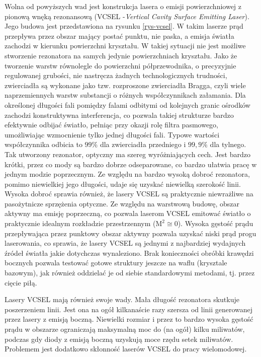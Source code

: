 \documentclass[a4paper,10pt]{article}
\begin{document}
Wolna od powyższych wad jest konstrukcja lasera o emisji powierzchniowej z pionową wnęką rezonansową (VCSEL -\textit{Vertical Cavity Surface Emitting Laser}). Jego budowa jest przedstawiona na rysunku \ref{rys-vcsel}. W takim laserze prąd przepływa przez obszar mający postać punktu, nie paska, a emisja światła zachodzi w kierunku powierzchni kryształu. W takiej sytuacji nie jest możliwe stworzenie rezonatora na samych jedynie powierzchniach kryształu. Jako że tworzenie warstw równolegle do powierzchni półprzewodnika, o precyzyjnie regulowanej grubości, nie nastręcza żadnych technologicznych trudności, zwierciadła są wykonane jako tzw. rozproszone zwierciadła Bragga, czyli wiele naprzemiennych warstw substancji o różnych współczynnikach załamania. Dla określonej długości fali pomiędzy falami odbitymi od kolejnych granic ośrodków zachodzi konstruktywna interferencja, co pozwala takiej strukturze bardzo efektywnie odbijać światło, pełniąc przy okazji rolę filtra pasmowego, umożliwiając wzmocnienie tylko jednej długości fali. Typowe wartości współczynnika odbicia to $99\%$ dla zwierciadła przedniego i $99{,}9\%$ dla tylnego. Tak utworzony rezonator, optyczny ma szereg wyróżniających cech. Jest bardzo krótki, przez co mody są bardzo dobrze odseparowane, co bardzo ułatwia pracę w jednym modzie poprzecznym. Ze względu na bardzo wysoką dobroć rezonatora, pomimo niewielkiej jego długości, udaje się uzyskać niewielką szerokość linii. Wysoka dobroć sprawia również, że lasery VCSEL są praktycznie niewrażliwe na pasożytnicze sprzężenia optyczne.
Ze względu na warstwową budowę, obszar aktywny ma emisję poprzeczną, co pozwala laserom VCSEL emitować światło o praktycznie idealnym rozkładzie przestrzennym ($\mathrm{M^2} \cong 0$). Wysoka gęstość prądu przepływająca przez punktowy obszar aktywny pozwala uzyskać niski prąd progu laserowania, co sprawia, że lasery VCSEL są jednymi z najbardziej wydajnych źródeł światła jakie dotychczas wynaleziono. Brak konieczności obróbki krawędzi bocznych pozwala testować gotowe struktury jeszcze na waflu (krysztale bazowym), jak również oddzielać je od siebie standardowymi metodami, tj. przez cięcie piłą. 

Lasery VCSEL mają również swoje wady. Mała długość rezonatora skutkuje poszerzeniem linii. Jest ona na ogół kilkanaście razy szersza od linii generowanej przez lasery z emisją boczną. Niewielki rozmiar i przez to bardzo wysoka gęstość prądu w obszarze ograniczają maksymalną moc do (na ogół) kilku miliwatów, podczas gdy diody z emisją boczną uzyskują moce rzędu setek miliwatów. Problemem jest dodatkowo skłonność laserów VCSEL do pracy wielomodowej.
\end{document}
